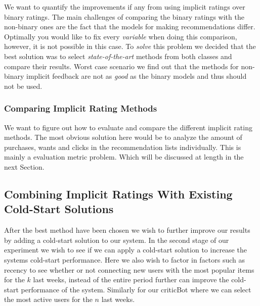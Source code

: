 We want to quantify the improvements if any from using implicit ratings over binary ratings.
The main challenges of comparing the binary ratings with the non-binary ones are the fact
that the models for making recommendations differ. Optimally you would like to fix every
\emph{variable} when doing this comparison, however, it is not possible in this case.
To \emph{solve} this problem we decided that the best solution was to select \emph{state-of-the-art}
methods from both classes and compare their results. Worst case scenario we find out that the
methods for non-binary implicit feedback are not as \emph{good} as the binary models and thus
should not be used.

\subsubsection{Comparing Implicit Rating Methods}

We want to figure out how to evaluate and compare the different implicit rating methods. 
The most obvious solution here would be to analyze the amount of purchases, wants and clicks
in the recommendation lists individually. This is mainly a evaluation metric problem. Which
will be discussed at length in the next Section.



\subsection{Combining Implicit Ratings With Existing Cold-Start Solutions}


After the best method have been chosen we wish to further improve our results by adding
a cold-start solution to our system. In the second stage of our experiment we wish
to see if we can apply a cold-start solution to increase the systems cold-start performance.
Here we also wish to factor in factors such as recency to see whether or not connecting
new users with the most popular items for the $k$ last weeks, instead of the entire
period further can improve the cold-start performance of the system. Similarly
for our criticBot where we can select the most active users for the $n$ last weeks.

